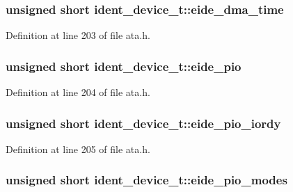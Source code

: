 \subsubsection[{\texorpdfstring{eide\+\_\+dma\+\_\+time}{eide_dma_time}}]{\setlength{\rightskip}{0pt plus 5cm}unsigned short ident\+\_\+device\+\_\+t\+::eide\+\_\+dma\+\_\+time}\hypertarget{structident__device__t_a3f67d5fd310f8f431fe807350616878f}{}\label{structident__device__t_a3f67d5fd310f8f431fe807350616878f}


Definition at line 203 of file ata.\+h.

\subsubsection[{\texorpdfstring{eide\+\_\+pio}{eide_pio}}]{\setlength{\rightskip}{0pt plus 5cm}unsigned short ident\+\_\+device\+\_\+t\+::eide\+\_\+pio}\hypertarget{structident__device__t_a6dc57a8c2a8ba3ce73ad1d48a8c22178}{}\label{structident__device__t_a6dc57a8c2a8ba3ce73ad1d48a8c22178}


Definition at line 204 of file ata.\+h.

\subsubsection[{\texorpdfstring{eide\+\_\+pio\+\_\+iordy}{eide_pio_iordy}}]{\setlength{\rightskip}{0pt plus 5cm}unsigned short ident\+\_\+device\+\_\+t\+::eide\+\_\+pio\+\_\+iordy}\hypertarget{structident__device__t_a5dda74b9cc6f4458e81f91cb2b1d6a1d}{}\label{structident__device__t_a5dda74b9cc6f4458e81f91cb2b1d6a1d}


Definition at line 205 of file ata.\+h.

\subsubsection[{\texorpdfstring{eide\+\_\+pio\+\_\+modes}{eide_pio_modes}}]{\setlength{\rightskip}{0pt plus 5cm}unsigned short ident\+\_\+device\+\_\+t\+::eide\+\_\+pio\+\_\+modes}\hypertarget{structident__device__t_aa47dec5c44da729522f14edc7ca02f8b}{}\label{structident__device__t_aa47dec5c44da729522f14edc7ca02f8b}


